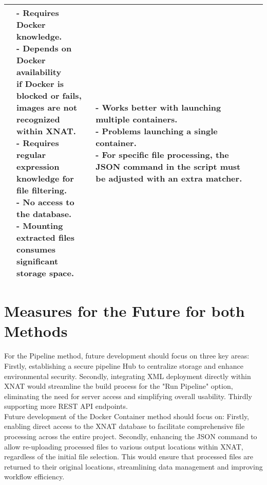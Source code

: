 \begin{table}[htbp]
\begin{tabular}{|p{2cm}|p{5cm}|p{4cm}|p{3cm}|}
{}
&
\parbox[t]{6cm}{
- Requires Docker knowledge. \\
- Depends on Docker availability \\if Docker is blocked or fails, \\images are not recognized\\ within XNAT. \\
- Requires regular expression\\ knowledge for file filtering. \\
- No access to the database. \\
- Mounting extracted files \\ consumes significant \\storage space.\\
}
&
\parbox[t]{4cm}{
- Works better with launching multiple containers. \\
- Problems launching a single container. \\
- For specific file processing, the JSON command in the script must be adjusted with an extra matcher.
} \\
\hline
\end{tabular}
\label{tab:docker_pipeline}
\end{table}


\section{Measures for the Future for both Methods}

For the Pipeline method, future development should focus on three key areas: Firstly, establishing a secure pipeline Hub to centralize storage and enhance environmental security. Secondly, integrating XML deployment directly within XNAT would streamline the build process for the "Run Pipeline" option, eliminating the need for server access and simplifying overall usability. Thirdly supporting more REST API endpoints.\\
Future development of the Docker Container method should focus on: Firstly, enabling direct access to the XNAT database to facilitate comprehensive file processing across the entire project. Secondly, enhancing the JSON command to allow re-uploading processed files to various output locations within XNAT, regardless of the initial file selection. This would ensure that processed files are returned to their original locations, streamlining data management and improving workflow efficiency.


